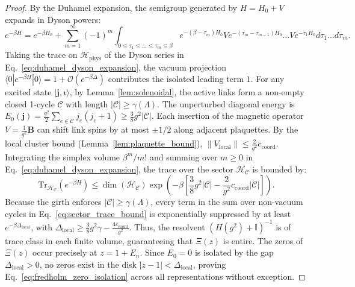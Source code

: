 \documentclass[11pt,reqno]{article}
\begin{document}
\begin{proof}
By the Duhamel expansion, the semigroup generated by $H = H_0 + V$ expands in Dyson powers:
\begin{equation}
    \label{eq:duhamel_dyson_expansion}
    e^{-\beta H} = e^{-\beta H_0} + \sum_{m=1}^\infty (-1)^m \int_{0 \le \tau_1 \le \dots \le \tau_m \le \beta} e^{-(\beta - \tau_m)H_0} V e^{-(\tau_m - \tau_{m-1})H_0} \dots V e^{-\tau_1 H_0} d\tau_1 \dots d\tau_m.
\end{equation}
Taking the trace on $\mathcal{H}_{\mathrm{phys}}$ of the Dyson series in Eq.~\eqref{eq:duhamel_dyson_expansion}, the vacuum projection $\langle 0 | e^{-\beta H} | 0 \rangle = 1 + \mathcal{O}(e^{-\beta \Delta})$ contributes the isolated leading term $1$.
For any excited state $|\mathbf{j}, \bm{\iota}\rangle$, by Lemma~\ref{lem:solenoidal}, the active links form a non-empty closed 1-cycle $\mathcal{C}$ with length $|\mathcal{C}| \ge \gamma(\Lambda)$.
The unperturbed diagonal energy is $E_0(\mathbf{j}) = \frac{g^2}{2} \sum_{e \in \mathcal{C}} j_e(j_e+1) \ge \frac{3}{8} g^2 |\mathcal{C}|$.
Each insertion of the magnetic operator $V = \frac{1}{g^2}\mathbf{B}$ can shift link spins by at most $\pm 1/2$ along adjacent plaquettes.
By the local cluster bound (Lemma~\ref{lem:plaquette_bound}), $\|V_{\mathrm{local}}\| \le \frac{2}{g^2} c_{\mathrm{coord}}$.
Integrating the simplex volume $\beta^m / m!$ and summing over $m \ge 0$ in Eq.~\eqref{eq:duhamel_dyson_expansion}, the trace over the sector $\mathcal{H}_{\mathcal{C}}$ is bounded by:
\begin{equation}
    \label{eq:sector_trace_bound}
    \mathrm{Tr}_{\mathcal{H}_{\mathcal{C}}}\left( e^{-\beta H} \right) \le \dim(\mathcal{H}_{\mathcal{C}}) \exp\left( -\beta \left[ \frac{3}{8} g^2 |\mathcal{C}| - \frac{2}{g^2} c_{\mathrm{coord}} |\mathcal{C}| \right] \right).
\end{equation}
Because the girth enforces $|\mathcal{C}| \ge \gamma(\Lambda)$, every term in the sum over non-vacuum cycles in Eq.~\eqref{eq:sector_trace_bound} is exponentially suppressed by at least $e^{-\beta \Delta_{\mathrm{local}}}$, with $\Delta_{\mathrm{local}} \ge \frac{3}{8} g^2 \gamma - \frac{4 c_{\mathrm{coord}}}{g^2}$.
Thus, the resolvent $(H(g^2) + \mathbb{I})^{-1}$ is of trace class in each finite volume, guaranteeing that $\Xi(z)$ is entire.
The zeros of $\Xi(z)$ occur precisely at $z = 1 + E_n$. Since $E_0 = 0$ is isolated by the gap $\Delta_{\mathrm{local}} > 0$, no zeros exist in the disk $|z - 1| < \Delta_{\mathrm{local}}$, proving Eq.~\eqref{eq:fredholm_zero_isolation} across all representations without exception.
\end{proof}
\end{document}
